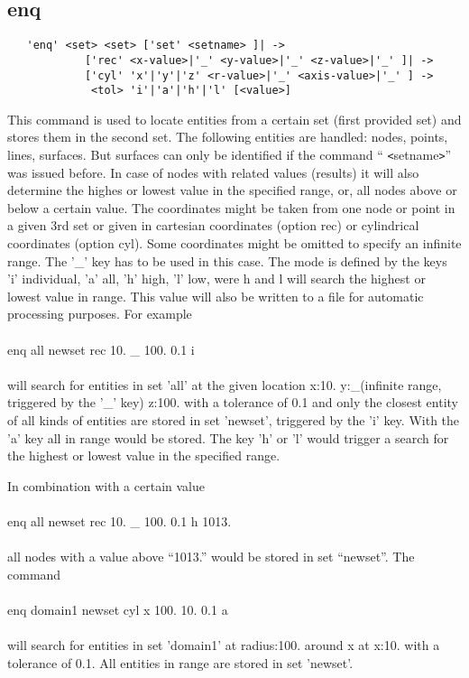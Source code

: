 \documentclass{article}
\begin{document}
\subsection{\label{enq}enq}
\begin{verbatim}
   'enq' <set> <set> ['set' <setname> ]| -> 
            ['rec' <x-value>|'_' <y-value>|'_' <z-value>|'_' ]| ->
            ['cyl' 'x'|'y'|'z' <r-value>|'_' <axis-value>|'_' ] -> 
             <tol> 'i'|'a'|'h'|'l' [<value>]
\end{verbatim}
This command is used to locate entities from a certain set (first provided set) and stores them in the second set. The following entities are handled: nodes, points, lines, surfaces. But surfaces can only be identified if the command `` \verb_<_setname\verb_>_'' was issued before. In case of nodes with related values (results) it will also determine the highes or lowest value in the specified range, or, all nodes above or below a certain value. The coordinates might be taken from one node or point in a given 3rd set or given in cartesian coordinates (option rec) or cylindrical coordinates (option cyl). Some coordinates might be omitted to specify an infinite range. The '\_' key has to be used in this case. The mode is defined by the keys 'i' individual, 'a' all, 'h' high, 'l' low, were h and l will search the highest or lowest value in range. This value will also be written to a file for automatic processing purposes. For example\\\\
enq all newset rec 10. \_ 100. 0.1 i\\\\
will search for entities in set 'all' at the given location x:10. y:\_(infinite range, triggered by the '\_' key) z:100. with a tolerance of 0.1 and only the closest entity of all kinds of entities are stored in set 'newset', triggered by the 'i' key. With the 'a' key all in range would be stored. The key 'h' or 'l' would trigger a search for the highest or lowest value in the specified range. 

In combination with a certain value\\\\
enq all newset rec 10. \_ 100. 0.1 h 1013.\\\\all nodes with a value above ``1013.'' would be stored in set ``newset''. The command \\\\
enq domain1 newset cyl x 100. 10. 0.1 a\\\\
will search for entities in set 'domain1' at radius:100. around x at x:10. with a tolerance of 0.1. All entities in range are stored in set 'newset'.
\end{document}
